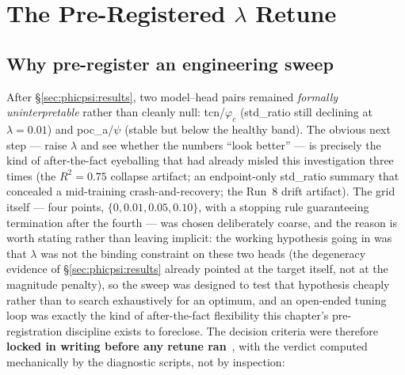 \section{The Pre-Registered $\lambda$ Retune}
\label{sec:phicpsi:prereg}

\subsection{Why pre-register an engineering sweep}
\label{subsec:why-pre-register-an-engineering-sweep}

After \S\ref{sec:phicpsi:results}, two model--head pairs remained \emph{formally uninterpretable} rather than cleanly null: tcn/$\varphi_c$ (std\_ratio still declining at $\lambda = 0.01$) and poc\_a/$\psi$ (stable but below the healthy band).
The obvious next step --- raise $\lambda$ and see whether the numbers ``look better'' --- is precisely the kind of after-the-fact eyeballing that had already misled this investigation three times (the $R^2 = 0.75$ collapse artifact; an endpoint-only std\_ratio summary that concealed a mid-training crash-and-recovery; the Run~8 drift artifact).
The grid itself --- four points, $\{0, 0.01, 0.05, 0.10\}$, with a stopping rule guaranteeing termination after the fourth --- was chosen deliberately coarse, and the reason is worth stating rather than leaving implicit: the working hypothesis going in was that $\lambda$ was not the binding constraint on these two heads (the degeneracy evidence of \S\ref{sec:phicpsi:results} already pointed at the target itself, not at the magnitude penalty), so the sweep was designed to test that hypothesis cheaply rather than to search exhaustively for an optimum, and an open-ended tuning loop was exactly the kind of after-the-fact flexibility this chapter's pre-registration discipline exists to foreclose.
The decision criteria were therefore \textbf{locked in writing before any retune ran}~\cite{nosek2018preregistration}, with the verdict computed mechanically by the diagnostic scripts, not by inspection:

